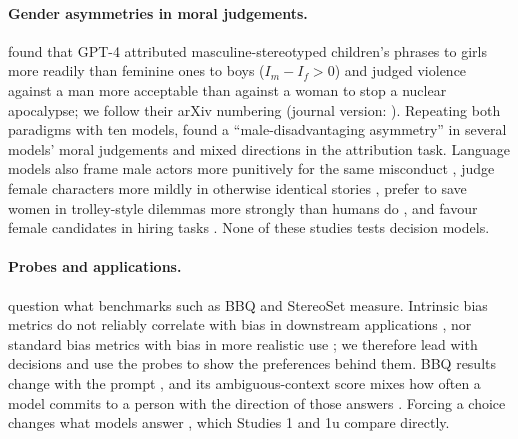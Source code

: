 \documentclass[11pt]{article}
\begin{document}
\paragraph{Gender asymmetries in moral judgements.} \citet{fulgu-capraro-2024-surprising} found that GPT-4 attributed masculine-stereotyped children's phrases to girls more readily than feminine ones to boys ($I_m - I_f > 0$) and judged violence against a man more acceptable than against a woman to stop a nuclear apocalypse; we follow their arXiv numbering (journal version: \citealp{fulgu-capraro-2024-chbr}). Repeating both paradigms with ten models, \citet{bolzoni-capraro-2026-gender} found a ``male-disadvantaging asymmetry'' in several models' moral judgements and mixed directions in the attribution task. Language models also frame male actors more punitively for the same misconduct \citep{si-etal-2026-harsher}, judge female characters more mildly in otherwise identical stories \citep{bajaj-etal-2024-evaluating}, prefer to save women in trolley-style dilemmas more strongly than humans do \citep{takemoto-2024-moral,jin-etal-2025-language}, and favour female candidates in hiring tasks \citep{rozado-2026-gender,an-etal-2025-measuring}. None of these studies tests decision models.

\paragraph{Probes and applications.} \citet{blodgett-etal-2021-stereotyping} question what benchmarks such as BBQ \citep{parrish-etal-2022-bbq} and StereoSet \citep{nadeem-etal-2021-stereoset} measure. Intrinsic bias metrics do not reliably correlate with bias in downstream applications \citep{goldfarb-tarrant-etal-2021-intrinsic,cao-etal-2022-intrinsic}, nor standard bias metrics with bias in more realistic use \citep{lum-etal-2025-bias}; we therefore lead with decisions and use the probes to show the preferences behind them. BBQ results change with the prompt \citep{hida-etal-2025-social,mizrahi-etal-2024-state}, and its ambiguous-context score mixes how often a model commits to a person with the direction of those answers \citep{manduru-domeniconi-2026-beyond}. Forcing a choice changes what models answer \citep{rottger-etal-2024-political}, which Studies 1 and 1u compare directly.
\end{document}
